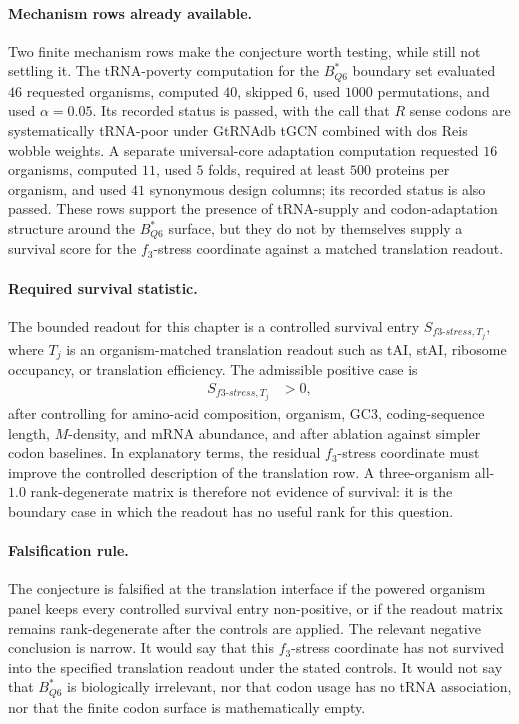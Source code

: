 \paragraph{Mechanism rows already available.}
Two finite mechanism rows make the conjecture worth testing, while still not settling it. The tRNA-poverty computation for the $B^{*}_{Q6}$ boundary set evaluated $46$ requested organisms, computed $40$, skipped $6$, used $1000$ permutations, and used $\alpha=0.05$. Its recorded status is passed, with the call that $R$ sense codons are systematically tRNA-poor under GtRNAdb tGCN combined with dos Reis wobble weights. A separate universal-core adaptation computation requested $16$ organisms, computed $11$, used $5$ folds, required at least $500$ proteins per organism, and used $41$ synonymous design columns; its recorded status is also passed. These rows support the presence of tRNA-supply and codon-adaptation structure around the $B^{*}_{Q6}$ surface, but they do not by themselves supply a survival score for the $f_3$-stress coordinate against a matched translation readout.

\paragraph{Required survival statistic.}
The bounded readout for this chapter is a controlled survival entry $S_{f3\text{-}stress,T_j}$, where $T_j$ is an organism-matched translation readout such as tAI, stAI, ribosome occupancy, or translation efficiency. The admissible positive case is
$$
\begin{aligned}
S_{f3\text{-}stress,T_j} &> 0,
\end{aligned}
$$
after controlling for amino-acid composition, organism, GC3, coding-sequence length, $M$-density, and mRNA abundance, and after ablation against simpler codon baselines. In explanatory terms, the residual $f_3$-stress coordinate must improve the controlled description of the translation row. A three-organism all-$1.0$ rank-degenerate matrix is therefore not evidence of survival: it is the boundary case in which the readout has no useful rank for this question.

\paragraph{Falsification rule.}
The conjecture is falsified at the translation interface if the powered organism panel keeps every controlled survival entry non-positive, or if the readout matrix remains rank-degenerate after the controls are applied. The relevant negative conclusion is narrow. It would say that this $f_3$-stress coordinate has not survived into the specified translation readout under the stated controls. It would not say that $B^{*}_{Q6}$ is biologically irrelevant, nor that codon usage has no tRNA association, nor that the finite codon surface is mathematically empty.

